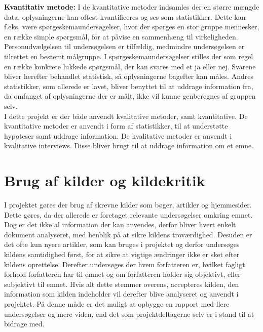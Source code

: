 \noindent\textbf{Kvantitativ metode:}
I de kvantitative metoder indsamles der en større mængde data, oplysningerne kan oftest kvantificeres og ses som statistikker. Dette kan f.eks. være spørgeskemaundersøgelser, hvor der spørges en stor gruppe mennesker, en række simple spørgsmål, for at påvise en sammenhæng til virkeligheden. Personudvælgelsen til undersøgelsen er tilfældig, medmindre undersøgelsen er tilrettet en bestemt målgruppe. I spørgeskemaundersøgelser stilles der som regel en række konkrete lukkede spørgsmål, der kan svares med et ja eller nej. Svarene bliver herefter behandlet statistisk, så oplysningerne bagefter kan måles. Andres statistikker, som allerede er lavet, bliver benyttet til at uddrage information fra, da omfanget af oplysningerne der er målt, ikke vil kunne genberegnes af gruppen selv. \citep{Kvan, Gymportalen}\\

\noindent I dette projekt er der både anvendt kvalitative metoder, samt kvantitative. De kvantitative metoder er anvendt i form af statistikker, til at understøtte hypoteser samt uddrage information. De kvalitative metoder er anvendt i kvalitative interviews. Disse bliver brugt til at uddrage information om et emne.

\section{Brug af kilder og kildekritik}
I projektet gøres der brug af skrevne kilder som bøger, artikler og hjemmesider. Dette gøres, da der allerede er foretaget relevante undersøgelser omkring emnet. Dog er det ikke al information der kan anvendes, derfor bliver hvert enkelt dokument analyseret, med henblik på at sikre kildens troværdighed. Desuden er det ofte kun nyere artikler, som kan bruges i projektet og derfor undersøges kildens samtidighed først, for at sikre at vigtige ændringer ikke er sket efter kildens oprettelse. Derefter undersøges der hvem forfatteren er, hvilket fagligt forhold forfatteren har til emnet og om forfatteren holder sig objektivt, eller subjektivt til emnet. Hvis alt dette stemmer overens, accepteres kilden, den information som kilden indeholder vil derefter blive analyseret og anvendt i projektet. På denne måde er det muligt at opbygge en rapport med flere undersøgelser og mere viden, end det som projektdeltagerne selv er i stand til at bidrage med. \citep{Kildekritik}


